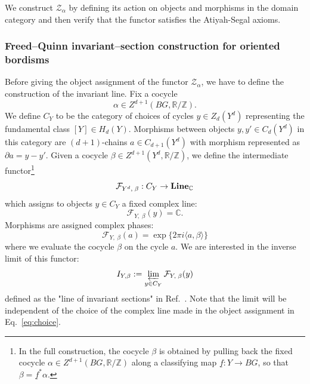 \documentclass[aps,prx,reprint,superscriptaddress,twocolumn,amsmath,amssymb,amsfonts, nofootinbib]{revtex4-2}
\newcommand{\Line}{{\bf Line}_{\mathbb{C}}}
\theoremstyle{apsstyle}
\begin{document}
\bigskip

\noindent We construct $\mathcal Z_\alpha$ by defining its action on objects and morphisms in the domain category and then verify that the functor satisfies the Atiyah-Segal axioms. 

\subsubsection{Freed–Quinn invariant–section construction for oriented bordisms}
\label{app:FQ-invariant-section}

Before giving the object assignment of the functor $\mathcal Z_{\alpha}$, we have to define the construction of the invariant line. Fix a cocycle
\begin{equation*}
    \alpha\in Z^{d+1}(BG,\mathbb R/\mathbb Z).
\end{equation*}
We define $C_{Y}$ to be the category of choices of cycles $y\in Z_{d}(Y^{d})$ representing the fundamental class $[Y]\in H_{d}(Y)$. Morphisms between objects $y,y'\in C_{d}(Y^{d})$ in this category are $(d+1)$-chains $a\in C_{d+1}(Y^{d})$ with morphism represented as $\partial a=y-y'$. Given a cocycle
$\beta\in Z^{d+1}(Y^{d},\mathbb R/\mathbb Z)$, we define the
intermediate functor\footnote{In the full construction, the cocycle
$\beta$ is obtained by pulling back the fixed cocycle
$\alpha\in Z^{d+1}(BG,\mathbb R/\mathbb Z)$ along a classifying map
$\underline f:Y\to BG$, so that $\beta=\underline f^{*}\alpha$.}
\begin{equation}
\label{eq:func_inter}
    \mathcal{F}_{Y^{d},\; \beta}: C_{Y} \to \Line
\end{equation}
which assigns to objects $y\in C_{Y}$ a fixed complex line:
\begin{equation}
\label{eq:choice}
    \mathcal{F}_{Y,\; \beta}(y)=\mathbb{C}.
\end{equation}
Morphisms are assigned complex phases:
\begin{equation*}
    \mathcal{F}_{Y,\; \beta}(a)=\exp\{2\pi i \langle a, \beta\rangle\}
\end{equation*}
where we evaluate the cocycle $\beta$ on the cycle $a$. We are interested in the inverse limit of this functor:
\begin{equation*}
    I_{Y,\beta}:= \varprojlim_{y\in C_{Y}} \mathcal{F}_{Y,\; \beta}(y)
\end{equation*}
defined as the "line of invariant sections" in Ref.~\cite{FreedQuinn}. Note that the limit will be independent of the choice of the complex line made in the object assignment in Eq.~\ref{eq:choice}.
\end{document}

